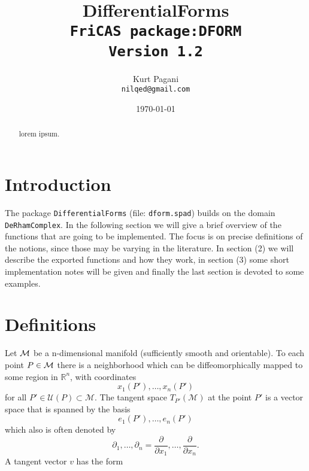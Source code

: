 \documentclass[12pt,a4paper]{article}
\author{Kurt Pagani \\ {\tt nilqed@gmail.com}}
\date{\today}
\title{DifferentialForms \\ {\small\tt FriCAS package:DFORM \\ Version 1.2}}
\newcommand{\RR}[1]{\mathbb{R}^{#1}}
\begin{document}
\maketitle
%
\begin{abstract}
lorem ipsum. 
\end{abstract}
%
\section{Introduction}
The package {\tt DifferentialForms} (file: {\tt dform.spad}) builds on the
domain {\tt DeRhamComplex}. In the following section we will give a brief 
overview of the functions that are going to be implemented. The focus is 
on precise definitions of the notions, since those may be varying in the 
literature. In section (2) we will describe the exported functions and 
how they work, in section (3) some short implementation notes will be 
given and finally the last section is devoted to some examples.
%
\section{Definitions}
Let ${\cal M}$ be a n-dimensional manifold (sufficiently smooth and orientable). 
To each point $P\in{\cal M}$ there is a neighborhood which can be 
diffeomorphically mapped to some region in $\RR n$, with coordinates
\begin{displaymath}
   x_1 (P'), \ldots, x_n (P')
\end{displaymath}
for all $P' \in \mathcal{U} (P) \subset \mathcal{M}$. The tangent space
$T_{P'} (\mathcal{M})$ at the point $P'$ is a vector space that 
is spanned by the basis
\begin{displaymath}
    e_1 (P'), \ldots, e_n (P')
\end{displaymath}
which also is often denoted by 
\begin{displaymath}
   \partial_1, \ldots, \partial_n =
   \frac{\partial}{\partial x_1}, \ldots, 
   \frac{\partial}{\partial x_n}.  
\end{displaymath}
A tangent vector $v$ has the form
\end{document}
